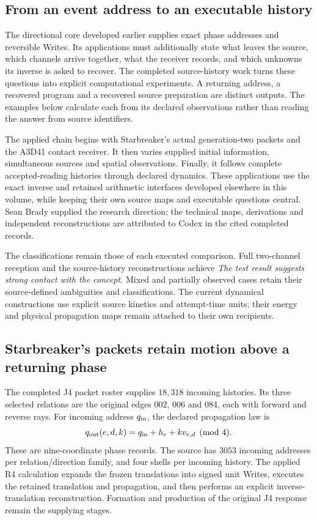 \label{v3-applications-history}

\subsection{From an event address to an executable history}

The directional core developed earlier supplies exact phase addresses and reversible Writes. Its applications must additionally state what leaves the source, which channels arrive together, what the receiver records, and which unknowns its inverse is asked to recover. The completed source-history work turns these questions into explicit computational experiments. A returning address, a recovered program and a recovered source preparation are distinct outputs. The examples below calculate each from its declared observations rather than reading the answer from source identifiers.

The applied chain begins with Starbreaker's actual generation-two packets and the A3D41 contact receiver. It then varies supplied initial information, simultaneous sources and spatial observations. Finally, it follows complete accepted-reading histories through declared dynamics. These applications use the exact inverse and retained arithmetic interfaces developed elsewhere in this volume, while keeping their own source maps and executable questions central. Sean Brady supplied the research direction; the technical maps, derivations and independent reconstructions are attributed to Codex in the cited completed records.

The classifications remain those of each executed comparison. Full two-channel reception and the source-history reconstructions achieve \emph{The test result suggests strong contact with the concept.} Mixed and partially observed cases retain their source-defined ambiguities and classifications. The current dynamical constructions use explicit source kinetics and attempt-time units; their energy and physical propagation maps remain attached to their own recipients.

\subsection{Starbreaker's packets retain motion above a returning phase}

The completed J4 packet roster supplies $18{,}318$ incoming histories. Its three selected relations are the original edges 002, 006 and 084, each with forward and reverse rays. For incoming address $q_{\rm in}$, the declared propagation law is
\[
 q_{\rm out}(e,d,k)=q_{\rm in}+h_e+kv_{e,d}
 \pmod4.
\]
These are nine-coordinate phase records. The source has $3053$ incoming addresses per relation/direction family, and four shells per incoming history. The applied R4 calculation expands the frozen translations into signed unit Writes, executes the retained translation and propagation, and then performs an explicit inverse-translation reconstruction. Formation and production of the original J4 response remain the supplying stages. 

